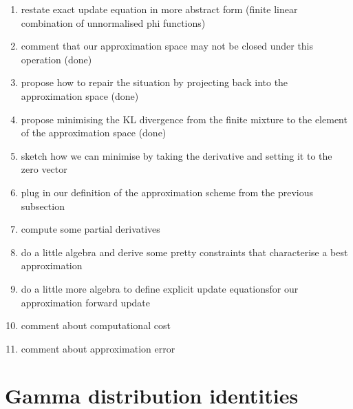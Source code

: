 \documentclass[twoside, 11pt]{article}
\begin{document}
\begin{enumerate}
\item restate exact update equation in more abstract form (finite linear combination of unnormalised phi functions)
\item comment that our approximation space may not be closed under this operation (done)
\item propose how to repair the situation by projecting back into the approximation space (done)
\item propose minimising the KL divergence from the finite mixture to the element of the approximation space (done)
\item sketch how we can minimise by taking the derivative and setting it to the zero vector
\item plug in our definition of the approximation scheme from the previous subsection
\item compute some partial derivatives
\item do a little algebra and derive some pretty constraints that characterise a best approximation
\item do a little more algebra to define explicit update equationsfor our approximation forward update
\item comment about computational cost
\item comment about approximation error
\end{enumerate}

\appendix

\section{Gamma distribution identities}
\label{appendix:gammaconj}
\end{document}
